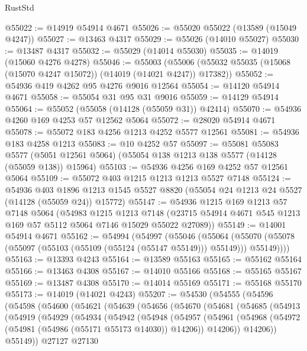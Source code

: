 \begin{lexlean}{RustStd}
\begin{coremodule}
@55022 := @14919 @54914 @4671
@55026 := @55020 @55022 (@13589 (@15049 @4247))
@55027 := @13463 @4317
@55029 := @55026 (@14010 @55027)
@55030 := @13487 @4317
@55032 := @55029 (@14014 @55030)
@55035 := @14019 (@15060 @4276 @4278)
@55046 := @55003
    (@55006 (@55032 @55035 (@15068 (@15070 @4247 @15072)) (@14019 (@14021 @4247)) @17382))
@55052 := @54936 @419 @4262 @95 @4276 @9016 @12564
@55054 := @14120 @54914 @4671
@55058 := @55054 @31 @95 @31 @9016
@55059 := @14129 @54914
@55064 := @55052 (@55058 (@14128 (@55059 @31)) @42414)
@55070 := @54936 @4260 @169 @4253 @57 @12562 @5064
@55072 := @28020 @54914 @4671
@55078 := @55072 @183 @4256 @1213 @4252 @5577 @12561
@55081 := @54936 @183 @4258 @1213
@55083 := @10 @4252 @57
@55097 := @55081
    @55083
    @5577
    (@5051 @12561 @5064)
    (@55054 @138 @1213 @138 @5577 (@14128 (@55059 @138)) @15964)
@55103 := @54936 @4256 @169 @4252 @57 @12561 @5064
@55109 := @55072 @403 @1215 @1213 @1213 @5527 @7148
@55124 := @54936
    @403
    @1896
    @1213
    @1545
    @5527
    @8820
    (@55054 @24 @1213 @24 @5527 (@14128 (@55059 @24)) @15772)
@55147 := @54936
    @1215
    @169
    @1213
    @57
    @7148
    @5064
    (@54983
      @1215
      @1213
      @7148
      (@23715 @54914 @4671 @545 @1213 @169 @57 @5112 @5064 @7146 @15029 @55022 @27089))
@55149 := @14001 @54914 @4671
@55162 := @54994
    (@54997
      (@55046
        (@55064
          (@55070 (@55078 (@55097 (@55103 (@55109 (@55124 (@55147 @55149))) @55149))) @55149))))
@55163 := @13393 @4243
@55164 := @13589 @55163
@55165 := @55162 @55164
@55166 := @13463 @4308
@55167 := @14010 @55166
@55168 := @55165 @55167
@55169 := @13487 @4308
@55170 := @14014 @55169
@55171 := @55168 @55170
@55173 := @14019 (@14021 @4243)
@55207 := @54530
    (@54555
      (@54596
        (@54598
          (@54600
            (@54621
              (@54639
                (@54656
                  (@54670
                    (@54681
                      (@54685
                        (@54913
                          (@54919
                            (@54929
                              (@54934
                                (@54942
                                  (@54948
                                    (@54957
                                      (@54961
                                        (@54968
                                          (@54972 (@54981 (@54986 (@55171 @55173 @14030)) @14206))
                                          @14206))
                                      @14206))
                                  @55149))
                              @27127
                              @27130

\end{coremodule}
\end{lexlean}
